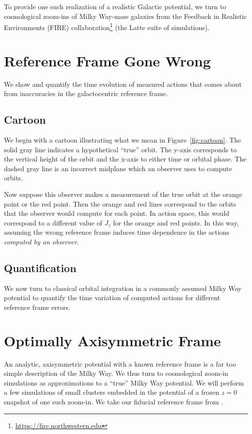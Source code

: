\documentclass[twocolumn]{aastex62}
\newcommand{\z}{z}
\begin{document}
To provide one such realization of a realistic Galactic potential, we turn to
cosmological zoom-ins of Milky Way-mass galaxies from the Feedback in
Realistic Environments (FIRE)
collaboration\footnote{\url{https://fire.northwestern.edu}} (the Latte suite
of simulations).

\section{Reference Frame Gone Wrong} \label{sec:ref_frame}
We show and quantify the time evolution of measured actions that comes about
from inaccuracies in the galactocentric reference frame.

\subsection{Cartoon} \label{ssec:cartoon}
We begin with a cartoon illustrating what we mean in Figure~\ref{fig:cartoon}.
The solid gray line indicates a hypothetical ``true'' orbit. The y-axis
corresponds to the vertical height of the orbit and the x-axis to either time
or orbital phase. The dashed gray line is an incorrect midplane which an
observer uses to compute orbits.

Now suppose this observer makes a measurement of the true orbit at the orange
point or the red point. Then the orange and red lines correspond to the orbits
that the observer would compute for each point. In action space, this would
correspond to a different value of $J_z$ for the orange and red points. In
this way, assuming the wrong reference frame induces time dependence in the
actions {\em computed by an observer}.

\begin{figure*}
\caption{Caption.}
\label{fig:cartoon}
\end{figure*}

\subsection{Quantification} \label{ssec:quant}
We now turn to classical orbital integration in a commonly assumed Milky Way potential to quantify the time variation of computed actions for different reference frame errors.



\section{Optimally Axisymmetric Frame} \label{sec:oa_frame}
An analytic, axisymmetric potential with a known reference frame is a far too
simple description of the Milky Way. We thus turn to cosmological zoom-in
simulations as approximations to a ``true'' Milky Way potential. We will
perform a few simulations of small clusters embedded in the potential of a
frozen $\z=0$ snapshot of one such zoom-in. We take our fiducial reference
frame from \citet{2018arXiv180610564S}.
\end{document}

